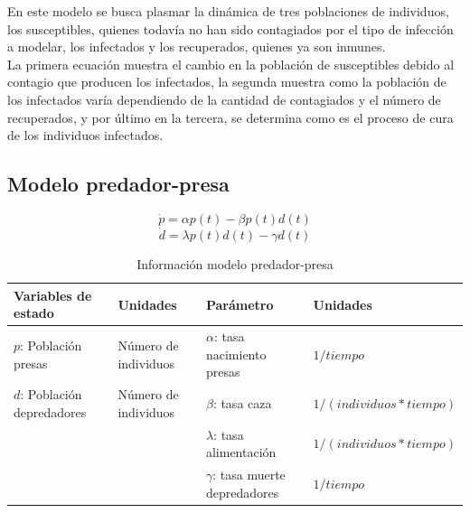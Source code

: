 \documentclass{article}
\begin{document}
        \vspace{0.5cm}

        En este modelo se busca plasmar la dinámica de tres poblaciones de
        individuos, los susceptibles, quienes todavía no han sido contagiados
        por el tipo de infección a modelar, los infectados y los recuperados,
        quienes ya son inmunes.\\

        La primera ecuación muestra el cambio en la población de
        susceptibles debido al contagio que producen los infectados, la
        segunda muestra como la población de los infectados varía
        dependiendo de la cantidad de contagiados y el número de recuperados, y
        por último en la tercera, se determina como es el proceso de cura
        de los individuos infectados.

    \subsection{Modelo predador-presa}

        \Large
        $$\dot{p} = \alpha p(t) - \beta p(t) d(t)$$
        $$\dot{d} = \lambda p(t) d(t) - \gamma d(t)$$
        \normalsize

        \vspace{0.5cm}

        \begin{table}[H]
        \begin{tabular}[t]{|p{4cm} p{3.5cm}|p{4.5cm} p{4cm}|}
            \hline
            \textbf{Variables de estado} & \textbf{Unidades} & \textbf{Parámetro} & \textbf{Unidades} \\
            \hline
            $p$: Población presas       & Número de individuos & $\alpha$: tasa nacimiento presas    & $1/tiempo$\\
            $d$: Población depredadores & Número de individuos & $\beta$: tasa caza                  & $1/(individuos * tiempo)$\\
                                        &                      & $\lambda$: tasa alimentación        & $1/(individuos * tiempo)$\\
                                        &                      & $\gamma$:  tasa muerte depredadores & $1/tiempo$\\
            \hline
        \end{tabular}
        \caption{Información modelo predador-presa \cite{predator}}
        \label{table:predator}
        \end{table}
\end{document}
